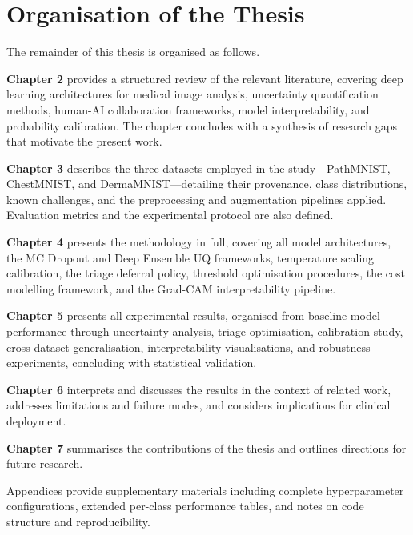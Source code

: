 \section{Organisation of the Thesis}

The remainder of this thesis is organised as follows.

\textbf{Chapter 2} provides a structured review of the relevant literature, covering deep learning architectures for medical image analysis, uncertainty quantification methods, human-AI collaboration frameworks, model interpretability, and probability calibration. The chapter concludes with a synthesis of research gaps that motivate the present work.

\textbf{Chapter 3} describes the three datasets employed in the study—PathMNIST, ChestMNIST, and DermaMNIST—detailing their provenance, class distributions, known challenges, and the preprocessing and augmentation pipelines applied. Evaluation metrics and the experimental protocol are also defined.

\textbf{Chapter 4} presents the methodology in full, covering all model architectures, the MC Dropout and Deep Ensemble UQ frameworks, temperature scaling calibration, the triage deferral policy, threshold optimisation procedures, the cost modelling framework, and the Grad-CAM interpretability pipeline.

\textbf{Chapter 5} presents all experimental results, organised from baseline model performance through uncertainty analysis, triage optimisation, calibration study, cross-dataset generalisation, interpretability visualisations, and robustness experiments, concluding with statistical validation.

\textbf{Chapter 6} interprets and discusses the results in the context of related work, addresses limitations and failure modes, and considers implications for clinical deployment.

\textbf{Chapter 7} summarises the contributions of the thesis and outlines directions for future research.

\noindent Appendices provide supplementary materials including complete hyperparameter configurations, extended per-class performance tables, and notes on code structure and reproducibility.
